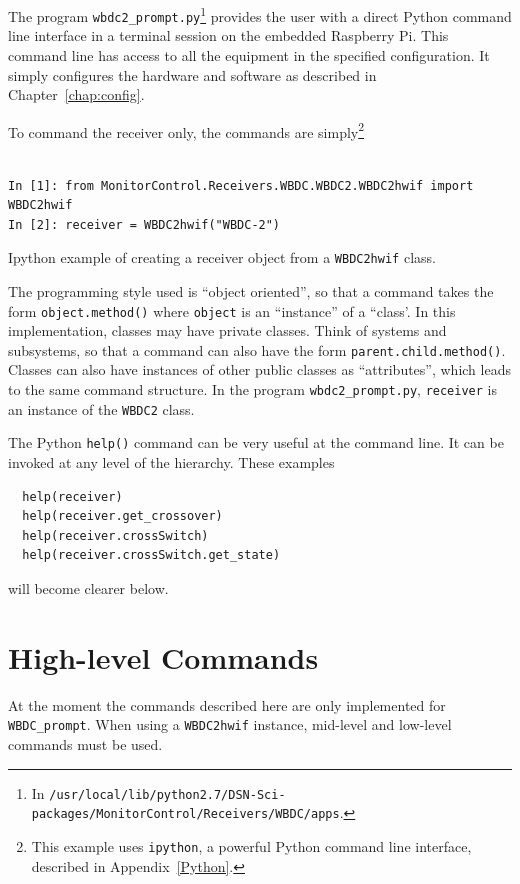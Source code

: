 \documentclass[letterpaper,11pt]{book}
\begin{document}
The program {\tt wbdc2\_prompt.py}\footnote{In
{\scriptsize \tt /usr/local/lib/python2.7/DSN-Sci-packages/MonitorControl/Receivers/WBDC/apps}.}
provides the user with a direct Python command line interface in a terminal 
session on the embedded Raspberry Pi. This command line has access to all
the equipment in the specified configuration.
It simply configures the hardware and 
software as described in Chapter~\ref{chap:config}.

To command the receiver only, the commands are simply\footnote{This example uses
{\tt ipython}, a powerful Python command line interface, described in 
Appendix~\ref{Python}.}
\begin{code}[h!tb]
\begin{center}
\begin{verbatim}
  
In [1]: from MonitorControl.Receivers.WBDC.WBDC2.WBDC2hwif import WBDC2hwif
In [2]: receiver = WBDC2hwif("WBDC-2")\end{verbatim}
\caption{\label{code:ipython}Ipython example of creating a receiver object from
a {\tt WBDC2hwif} class.}
\end{center}
\end{code}

The programming style used is ``object oriented'', 
so that a command takes the 
form {\tt object.method()} where {\tt object} is an ``instance'' of a ``class'.
In this implementation, classes may have private classes. Think of systems and 
subsystems, so that a command can also have the form
{\tt parent.child.method()}. Classes can also have instances of other public
classes as ``attributes'', which leads to the same command structure.
In the program {\tt wbdc2\_prompt.py}, {\tt receiver} is an instance of the
{\tt WBDC2} class.

The Python {\tt help()} command can be very useful at the command line.  It can
be invoked at any level of the hierarchy.  These examples 
\begin{verbatim}
  help(receiver)
  help(receiver.get_crossover)
  help(receiver.crossSwitch)
  help(receiver.crossSwitch.get_state)\end{verbatim}
will become clearer below.

\section{High-level Commands}

At the moment the commands described here are only implemented for 
{\tt WBDC\_prompt}.  When using a {\tt WBDC2hwif} instance, mid-level and
low-level commands must be used.
\end{document}
